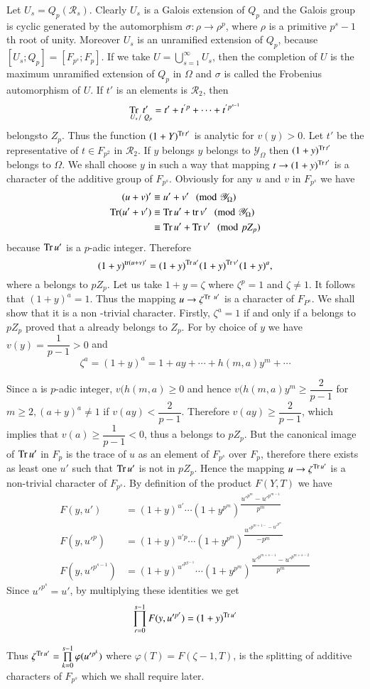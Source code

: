 Let $U_s = Q_p (\mathscr{R}_s)$. Clearly $U_s$ is a Galois extension
of $Q_p$ and the Galois group is cyclic generated by the automorphism
$\sigma: \rho  \to \rho^p $, where $\rho $ is a primitive $p^s-1$ th
root of unity.  Moreover $U_s$ is an unramified extension  of $Q_p$,
because $[ U_s; Q_p] =  [ F_{p^s}; F_p]$. If we take  $U=
\bigcup \limits_{s=1}^\infty U_s$, then the completion of $U$  is the
maximum unramified extension of $Q_p$ in $\Omega$ and $\sigma$ is
called the Frobenius automorphism of $U$. If $t'$ is an elements is
$\mathscr{R}_2$, then  
$$ 
\underset{U_s}{\operatorname{Tr}} \underset{/ ~ Q_p}{t'} = t'+t^{'p}+ \cdots + t ^{'p^{s-1}}
$$
belongs\pageoriginale to $Z_p$. Thus the function $(1+Y)^{\operatorname{Tr} t'}$ is analytic for
$v(y) > 0$. Let $t'$ be the representative of $t \in F_{p^2}$ in
$\mathscr{R}_2$. If $y$ belongs $y$ belongs to $\mathscr{Y}_ \Omega$
then $(1+y)^{\operatorname{Tr} t'}$ belongs to $\Omega$. We shall choose $y$ in such
a way that mapping  $t \to (1+y)^{\operatorname{Tr} t'}$ is a character of the
additive group of $F_{p^s}$. Obviously for any $u$ and $v$ in
$F_{p^s}$ we have  
\begin{align*} 
  (u+v)' & \equiv u' +v' ~\pmod {\mathscr{Y}_\Omega}\\
  \operatorname{Tr} (u' + v' ) &\equiv \operatorname{Tr} u' + \operatorname{tr} v' ~\pmod {\mathscr{Y}_\Omega}\\
  &\equiv \operatorname{Tr} u' + \operatorname{Tr} v' ~\pmod {p Z_p}
\end{align*}
because $\operatorname{Tr} u'$ is a $p$-adic integer. Therefore
$$
(1+y)^{\operatorname{tr}(u+v)'}=(1+y)^{\operatorname{Tr} u'}(1+y)^{\operatorname{Tr} v'}(1+y)^a, 
$$
where a belongs to $p Z_p$. Let us take $1+y= \zeta$ where $\zeta^p
=1$ and $\zeta \neq 1$. It follows that $(1+y)^a=1$. Thus the mapping $u
\to \zeta^{\operatorname{Tr}~u'}$ is a character of  $F_{P^s}$. We shall show that it is a non
-trivial character. Firstly,  $\zeta^a =1$ if and only if a belongs to
$p Z_p$ proved that a already belongs to $Z_p$. For by choice of $y$
we have  $v(y)= \dfrac{1}{p-1} > 0$ and 
$$
\zeta^a = (1+y)^a = 1+ ay + \cdots + h(m,a)y^m + \cdots 
$$ 

Since a is $p$-adic integer,  $v(h(m,a) \ge 0$ and hence $v(h(m,a)y^m
\ge \dfrac{2}{p-1}$ for $m \ge 2, (a+y)^a \neq 1$ if $v(ay) <
\dfrac{2}{p-1}$. Therefore $v(ay)\ge \dfrac{2}{p-1}$, which  implies
that $v(a)\ge \dfrac{1}{p-1} < 0$, thus a belongs to $p
Z_p$. But the canonical image of  $\operatorname{Tr} u'$ in $F_p$ is the trace of $u$
as an element of $F_{p^s}$ over  $F_p$, therefore there exists as
least one $u'$ such that $\operatorname{Tr} u'$ is not in $p Z_p$. Hence the mapping
$u \rightarrow \zeta^{\operatorname{Tr} u'}$ is a non-trivial character of
$F_{p^s}$. By definition of the product $F(Y,T)$ we have 
\begin{align*}
  F(y, u') & = (1+y)^{u'} \cdots (1+ y^{p^m})^{\dfrac{u'^{p^m} -u'^{p^{m-1}}}{p^m}} \\
  F(y,u'^p) &= (1+ y)^{u'p} \cdots (1+ y^{p^m})^{\dfrac{u'^{p^{m+1-}-u'^{p^m}}}{-p^m}}\\
  F(y,u'^{p^{s-1}}) & = (1+y)^{u'^{p^{g-1}}} \cdots (1+
  y^{p^m})^{\dfrac{u'^{p^{m+s-1}}-u'^{p^{m+s-2}}}{p^m}} 
\end{align*}\pageoriginale
Since $u'^{p^s}= u'$, by multiplying these identities we get 
$$
\prod_{r=0}^{s-1} F(y,u'^{p^r})= (1+y)^{\operatorname{Tr} u'}
$$

Thus $\zeta^{\operatorname{Tr} u'}= \prod\limits_{k=0}^{s-1} \varphi(u'^{p^k})$ where
$\varphi(T)= F( \zeta -1, T)$, is the splitting of additive
characters of $F_{p^s}$ which we shall require later. 
